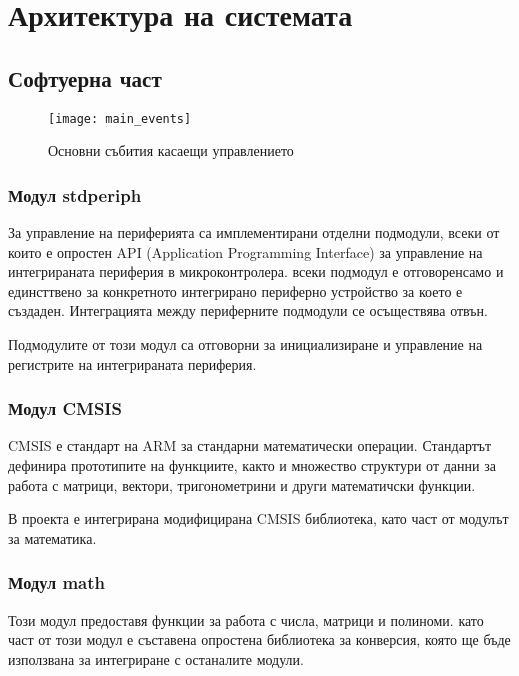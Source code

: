 \section{Архитектура на системата}



\subsection{Софтуерна част}

\begin{figure}[htpb!]
    \centering
    \texttt{[image: main\_events]}
    \caption{Основни събития касаещи управлението}
    \label{fig:main_events}
\end{figure}


\subsubsection{Модул stdperiph}

За управление на периферията са имплементирани отделни подмодули, всеки от които
е опростен API (Application Programming Interface) за управление на 
интегрираната периферия в микроконтролера. всеки подмодул е отговоренсамо и
единсттвено за конкретното интегрирано периферно устройство за което е създаден.
Интеграцията между периферните подмодули се осъществява отвън.

Подмодулите от този модул са отговорни за инициализиране и управление на
регистрите на интегрираната периферия. 

\subsubsection{Модул CMSIS}

CMSIS е стандарт на ARM за стандарни математически операции.
Стандартът дефинира прототипите на функциите, както и множество
структури от данни за работа с матрици, вектори, тригонометрини и 
други математичски функции.

В проекта е интегрирана модифицирана CMSIS библиотека, 
като част от модулът за математика.

\subsubsection{Модул math}

Този модул предоставя функции за работа с числа, матрици и полиноми.
като част от този модул е съставена опростена библиотека за конверсия,
която ще бъде използвана за интегриране с останалите модули.

